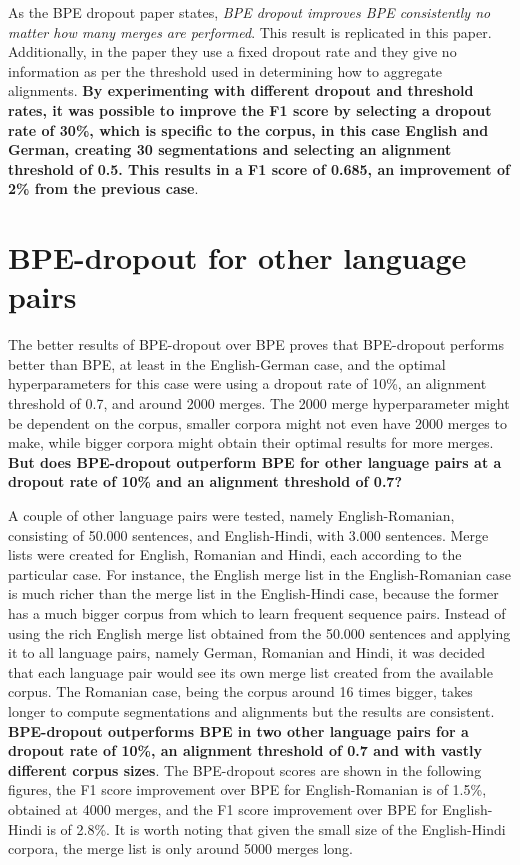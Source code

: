 As the BPE dropout paper states, \emph{BPE dropout improves BPE consistently no matter how many merges are performed}. This result is replicated in this paper. Additionally, in the paper they use a fixed dropout rate and they give no information as per the threshold used in determining how to aggregate alignments. \textbf{By experimenting with different dropout and threshold rates, it was possible to improve the F1 score by selecting a dropout rate of 30\%, which is specific to the corpus, in this case English and German, creating 30 segmentations and selecting an alignment threshold of 0.5. This results in a F1 score of 0.685, an improvement of 2\% from the previous case}.

\section{BPE-dropout for other language pairs}

The better results of BPE-dropout over BPE proves that BPE-dropout performs better than BPE, at least in the English-German case, and the optimal hyperparameters for this case were using a dropout rate of 10\%, an alignment threshold of 0.7, and around 2000 merges. The 2000 merge hyperparameter might be dependent on the corpus, smaller corpora might not even have 2000 merges to make, while bigger corpora might obtain their optimal results for more merges. \textbf{But does BPE-dropout outperform BPE for other language pairs at a dropout rate of 10\% and an alignment threshold of 0.7?}

A couple of other language pairs were tested, namely English-Romanian, consisting of 50.000 sentences, and English-Hindi, with 3.000 sentences. Merge lists were created for English, Romanian and Hindi, each according to the particular case. For instance, the English merge list in the English-Romanian case is much richer than the merge list in the English-Hindi case, because the former has a much bigger corpus from which to learn frequent sequence pairs. Instead of using the rich English merge list obtained from the 50.000 sentences and applying it to all language pairs, namely German, Romanian and Hindi, it was decided that each language pair would see its own merge list created from the available corpus. The Romanian case, being the corpus around 16 times bigger, takes longer to compute segmentations and alignments but the results are consistent. \textbf{BPE-dropout outperforms BPE in two other language pairs for a dropout rate of 10\%, an alignment threshold of 0.7 and with vastly different corpus sizes}. The BPE-dropout scores are shown in the following figures, the F1 score improvement over BPE for English-Romanian is of 1.5\%, obtained at 4000 merges, and the F1 score improvement over BPE for English-Hindi is of 2.8\%. It is worth noting that given the small size of the English-Hindi corpora, the merge list is only around 5000 merges long.

